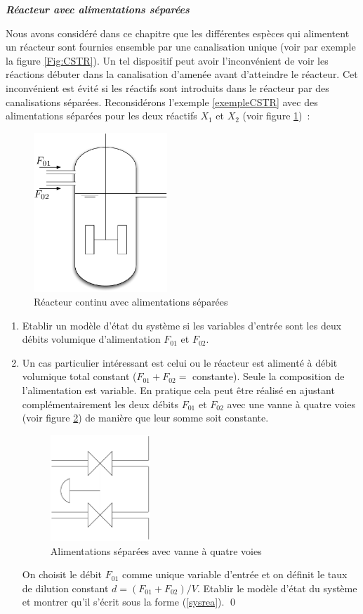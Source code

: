 \begin{exercice}{\bf \em Réacteur avec alimentations séparées}

Nous avons considéré dans ce chapitre que les différentes espèces qui alimentent un
réacteur sont fournies ensemble par une canalisation unique (voir par exemple la
figure \ref{Fig:CSTR}). Un tel dispositif peut avoir l'inconvénient de voir les
réactions débuter dans la canalisation d'amenée avant d'atteindre le réacteur. Cet
inconvénient est évité si les réactifs sont introduits dans le réacteur par des
canalisations séparées. Reconsidérons l'exemple \ref{exempleCSTR} avec des alimentations séparées pour
les deux réactifs $X_1$ et $X_2$ (voir figure \ref{Fig:CSTRsepar})~:
\begin{figure}[htbp] 
  \centering
   \includegraphics[height=6cm]{CSTRsepar} 
   \caption{Réacteur continu avec alimentations séparées}
   \label{Fig:CSTRsepar}
\end{figure}
\begin{enumerate}
\item Etablir un modèle d'état du système si les variables d'entrée sont les deux débits volumique d'alimentation $F_{01}$ et $F_{02}$.
\item Un cas particulier intéressant est celui ou le réacteur
est alimenté à débit volumique total constant ($F_{01} + F_{02} =$ constante).
Seule la composition de l'alimentation est variable. En pratique cela peut être
réalisé en ajustant complémentairement les deux débits $F_{01}$ et $F_{02}$
avec une vanne à quatre voies (voir figure \ref{Fig:vanne4voies}) de manière
que leur somme soit constante.  
\begin{figure}[htbp] 
   \centering
   \includegraphics[height=4cm]{vanne4voies} 
   \caption{Alimentations séparées avec vanne à quatre voies}
   \label{Fig:vanne4voies}
\end{figure}
On choisit le débit $F_{01}$
comme unique variable d'entrée et on définit le taux de dilution constant $d =
(F_{01} + F_{02})/V$. Etablir le modèle d'état du système et montrer qu'il s'écrit sous la forme (\ref{sysrea}). \qed
\end{enumerate}
\end{exercice}
\vv

